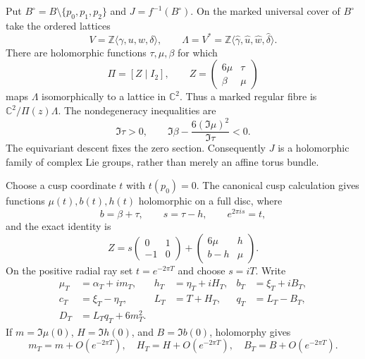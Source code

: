 \documentclass[11pt,letterpaper]{article}
\numberwithin{equation}{section}
\theoremstyle{definition}
\theoremstyle{remark}
\newcommand{\C}{\mathbb C}
\newcommand{\Z}{\mathbb Z}
\begin{document}
Put $B^\circ=B\setminus\{p_0,p_1,p_2\}$ and
$J=f^{-1}(B^\circ)$.  On the marked universal cover of $B^\circ$ take the
ordered lattices
\begin{equation}
 V=\Z\langle\gamma,u,w,\delta\rangle,
 \qquad
 \Lambda=V^*=\Z\langle\widehat\gamma,\widehat u,
                              \widehat w,\widehat\delta\rangle.
 \label{eq:lattices}
\end{equation}
There are holomorphic functions $\tau,\mu,\beta$ for which
\begin{equation}
 \Pi=[Z\mid I_2],\qquad
 Z=\begin{pmatrix}6\mu&\tau\\ \beta&\mu\end{pmatrix}
 \label{eq:period-matrix}
\end{equation}
maps $\Lambda$ isomorphically to a lattice in $\C^2$.  Thus a marked
regular fibre is $\C^2/\Pi(z)\Lambda$.  The nondegeneracy inequalities are
\begin{equation}
 \Im\tau>0,
 \qquad
 \Im\beta-\frac{6(\Im\mu)^2}{\Im\tau}<0.
 \label{eq:period-nondegeneracy}
\end{equation}
The equivariant descent fixes the zero section.  Consequently $J$ is a
holomorphic family of complex Lie groups, rather than merely an affine
torus bundle.

Choose a cusp coordinate $t$ with $t(p_0)=0$.  The canonical cusp
calculation gives functions $\mu(t),b(t),h(t)$ holomorphic on a full disc,
where
\begin{equation}
 b=\beta+\tau,\qquad s=\tau-h,\qquad e^{2\pi i s}=t,
 \label{eq:cusp-coordinates}
\end{equation}
and the exact identity is
\begin{equation}
 Z=s\begin{pmatrix}0&1\\-1&0\end{pmatrix}
   +\begin{pmatrix}6\mu&h\\b-h&\mu\end{pmatrix}.
 \label{eq:cusp-period-identity}
\end{equation}
On the positive radial ray set $t=e^{-2\pi T}$ and choose $s=iT$.  Write
\begin{equation}
 \begin{aligned}
 \mu_T&=\alpha_T+i m_T,&
 h_T&=\eta_T+iH_T,& b_T&=\xi_T+iB_T,\\
 c_T&=\xi_T-\eta_T,&
 L_T&=T+H_T,&q_T&=L_T-B_T,\\
 D_T&=L_Tq_T+6m_T^2.&&
 \end{aligned}
 \label{eq:radial-notation}
\end{equation}
If $m=\Im\mu(0)$, $H=\Im h(0)$, and $B=\Im b(0)$, holomorphy gives
\begin{equation}
 m_T=m+O(e^{-2\pi T}),\quad
 H_T=H+O(e^{-2\pi T}),\quad
 B_T=B+O(e^{-2\pi T}).
 \label{eq:radial-errors}
\end{equation}
\end{document}
